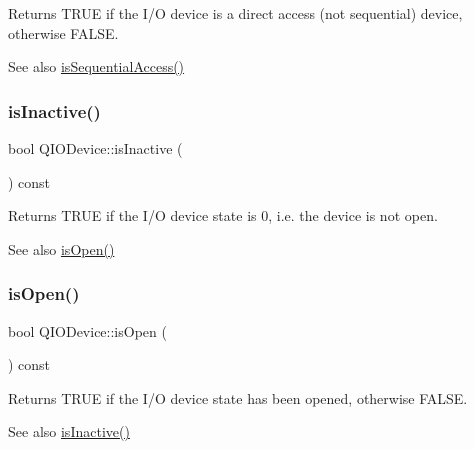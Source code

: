 Returns T\+R\+UE if the I/O device is a direct access (not sequential) device, otherwise F\+A\+L\+SE. \begin{DoxySeeAlso}{See also}
\mbox{\hyperlink{class_q_i_o_device_ab0c6f50325bbf1e860aed41f3bfa498c}{is\+Sequential\+Access()}} 
\end{DoxySeeAlso}
\mbox{\label{class_q_i_o_device_ac959646567aba4ad6c4e1f280e10bbdd}} 
\subsubsection{\texorpdfstring{isInactive()}{isInactive()}}
{\footnotesize\ttfamily bool Q\+I\+O\+Device\+::is\+Inactive (\begin{DoxyParamCaption}{ }\end{DoxyParamCaption}) const\hspace{0.3cm}{\ttfamily [inline]}}

Returns T\+R\+UE if the I/O device state is 0, i.\+e. the device is not open. \begin{DoxySeeAlso}{See also}
\mbox{\hyperlink{class_q_i_o_device_a291d97cdb38c1cd261bfbaa67a9d3923}{is\+Open()}} 
\end{DoxySeeAlso}
\mbox{\label{class_q_i_o_device_a291d97cdb38c1cd261bfbaa67a9d3923}} 
\subsubsection{\texorpdfstring{isOpen()}{isOpen()}}
{\footnotesize\ttfamily bool Q\+I\+O\+Device\+::is\+Open (\begin{DoxyParamCaption}{ }\end{DoxyParamCaption}) const\hspace{0.3cm}{\ttfamily [inline]}}

Returns T\+R\+UE if the I/O device state has been opened, otherwise F\+A\+L\+SE. \begin{DoxySeeAlso}{See also}
\mbox{\hyperlink{class_q_i_o_device_ac959646567aba4ad6c4e1f280e10bbdd}{is\+Inactive()}} 
\end{DoxySeeAlso}
\mbox{\label{class_q_i_o_device_a66e1eb78420a4ec15685871e2e773f68}} 
